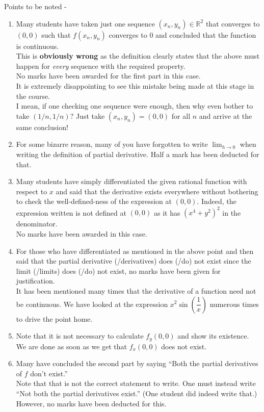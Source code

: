 \documentclass{article}
\begin{document}
\vspace{0.2 cm}

Points to be noted -
\begin{enumerate} 
	\item Many students have taken just one sequence $(x_n, y_n) \in \mathbb{R}^2$ that converges to $(0,0)$ such that $f(x_n, y_n)$ converges to $0$ and concluded that the function is continuous.\\
	This is \textbf{obviously wrong} as the definition clearly states that the above must happen for \emph{every} sequence with the required property. \\
	No marks have been awarded for the first part in this case. \\
	It is extremely disappointing to see this mistake being made at this stage in the course. \\
	I mean, if one checking one sequence were enough, then why even bother to take $(1/n, 1/n)?$ Just take $(x_n, y_n) = (0, 0)$ for all $n$ and arrive at the same conclusion!
	\item For some bizarre reason, many of you have forgotten to write $\displaystyle\lim_{h\to 0}$ when writing the definition of partial derivative. Half a mark has been deducted for that.
	\item Many students have simply differentiated the given rational function with respect to $x$ and said that the derivative exists everywhere without bothering to check the well-defined-ness of the expression at $(0,0).$ Indeed, the expression written is not defined at $(0,0)$ as it has $(x^4 + y^2)^2$ in the denominator.\\
	No marks have been awarded in this case.
	\item For those who have differentiated as mentioned in the above point and then said that the partial derivative (/derivatives) does (/do) not exist since the limit (/limits) does (/do) not exist, no marks have been given for justification.\\
	It has been mentioned many times that the derivative of a function need not be continuous. We have looked at the expression $x^2\sin\left(\dfrac{1}{x}\right)$ numerous times to drive the point home.
	\item Note that it is not necessary to calculate $f_y(0,0)$ and show its existence. We are done as soon as we get that $f_x(0,0)$ does not exist.
	\item Many have concluded the second part by saying ``Both the partial derivatives of $f$ don't exist.''\\
	Note that that is not the correct statement to write. One must instead write ``Not both the partial derivatives exist.'' (One student did indeed write that.)\\
	However, no marks have been deducted for this.
\end{enumerate}
\end{document}
